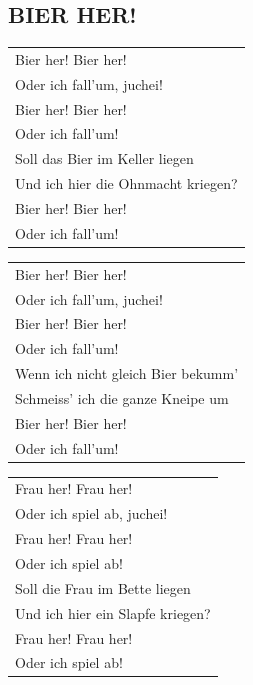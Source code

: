 \documentclass{article}
\begin{document}
\subsection*{BIER HER!}
\begin{flushleft}
\begin{tabularx}{\textwidth} {
    >{\raggedright\arraybackslash}X}
Bier her! Bier her!\\
Oder ich fall’um, juchei!\\
Bier her! Bier her!\\
Oder ich fall’um!\\
Soll das Bier im Keller liegen\\
Und ich hier die Ohnmacht kriegen?\\
Bier her! Bier her!\\
Oder ich fall’um!\\
\end{tabularx}
\end{flushleft}
\begin{flushleft}
\begin{tabularx}{\textwidth} {
    >{\raggedright\arraybackslash}X}
Bier her! Bier her!\\
Oder ich fall’um, juchei!\\
Bier her! Bier her!\\
Oder ich fall’um!\\
Wenn ich nicht gleich Bier bekumm’\\
Schmeiss’ ich die ganze Kneipe um\\
Bier her! Bier her!\\
Oder ich fall’um!\\
\end{tabularx}
\end{flushleft}
\begin{flushleft}
\begin{tabularx}{\textwidth} {
    >{\raggedright\arraybackslash}X}
Frau her! Frau her!\\
Oder ich spiel ab, juchei!\\
Frau her! Frau her!\\
Oder ich spiel ab!\\
Soll die Frau im Bette liegen\\
Und ich hier ein Slapfe kriegen?\\
Frau her! Frau her!\\
Oder ich spiel ab!\\
\end{tabularx}
\end{flushleft}
\end{document}
